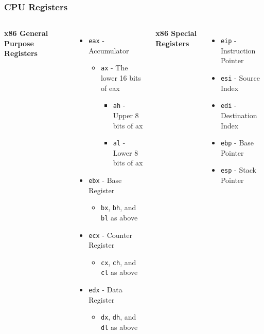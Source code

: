 \documentclass{beamer}
\begin{document}
\begin{frame}[t]
    \frametitle{CPU Registers}
    \begin{columns}[t]
    {\bf x86 General Purpose Registers}
    \begin{itemize}[<+->]
        \item {\tt eax} - Accumulator
        \begin{itemize}
            \item {\tt ax} - The lower 16 bits of eax
            \begin{itemize}
                \item {\tt ah} - Upper 8 bits of ax
                \item {\tt al} - Lower 8 bits of ax
            \end{itemize}
        \end{itemize}
        \item {\tt ebx} - Base Register
        \begin{itemize}
            \item {\tt bx}, {\tt bh}, and {\tt bl} as above
        \end{itemize}
        \item {\tt ecx} - Counter Register
        \begin{itemize}
            \item {\tt cx}, {\tt ch}, and {\tt cl} as above
        \end{itemize}
        \item {\tt edx} - Data Register
        \begin{itemize}
            \item {\tt dx}, {\tt dh}, and {\tt dl} as above
        \end{itemize}
    \end{itemize}
    
    {\bf x86 Special Registers} 
    \begin{itemize}[<+->]
        \item {\tt eip} - Instruction Pointer
        \item {\tt esi} - Source Index
        \item {\tt edi} - Destination Index
        \item {\tt ebp} - Base Pointer
        \item {\tt esp} - Stack Pointer
    \end{itemize}
    \end{columns}
\end{frame}
\end{document}
